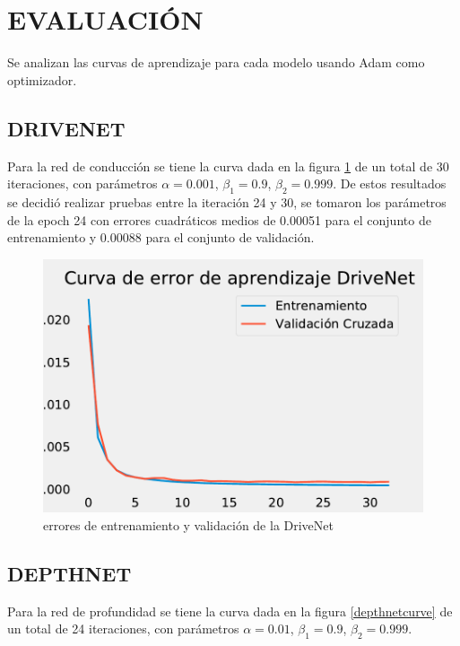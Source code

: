 \section{EVALUACIÓN}
Se analizan las curvas de aprendizaje para cada modelo usando Adam como optimizador.

\subsection{DRIVENET}
Para la red de conducción se tiene la curva dada en la figura \ref{drivenetcurve} de un total de 30 iteraciones, con parámetros $\alpha=0.001$, $\beta_1=0.9$, $\beta_2=0.999$. De estos resultados se decidió realizar pruebas entre la iteración 24 y 30, se tomaron los parámetros de la epoch 24 con errores cuadráticos medios de 0.00051 para el conjunto de entrenamiento y 0.00088 para el conjunto de validación.

\begin{figure}[H]
	\centering
	\includegraphics[scale=0.5]{imagenes/DriveNetCurve}
	\caption[Errores de entrenamiento y validación de la DriveNet]{errores de entrenamiento y validación de la DriveNet}
	\label{drivenetcurve}
\end{figure}

\subsection{DEPTHNET}
Para la red de profundidad se tiene la curva dada en la figura \ref{depthnetcurve} de un total de 24 iteraciones, con parámetros $\alpha=0.01$, $\beta_1=0.9$, $\beta_2=0.999$.

